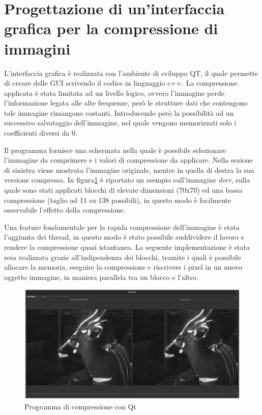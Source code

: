 \part{Progettazione di un'interfaccia grafica per la compressione di immagini}

L'interfaccia grafica è realizzata con l'ambiente di sviluppo QT\cite{qt}, il quale permette di creare delle GUI scrivendo il codice in linguaggio c++. La compressione applicata è stata limitata ad un livello logico, ovvero l'immagine perde l'informazione legata alle alte frequenze, però le strutture dati che contengono tale immagine rimangono costanti. Introducendo però la possibilità ad un successivo salvataggio dell'immagine, nel quale vengono memorizzati solo i coefficienti diversi da 0.

Il programma fornisce una schermata nella quale è possibile selezionare l'immagine da comprimere e i valori di compressione da applicare. Nella sezione di sinistra viene mostrata l'immagine originale, mentre in quella di destra la sua versione compressa. In figura\ref{fig:deer} è riportato un esempio sull'immagine \textit{deer}, sulla quale sono stati applicati blocchi di elevate dimensioni (70x70) ed una bassa compressione (taglio ad 11 su 138 possibili), in questo modo è facilmente osservabile l'effetto della compressione.

Una feature fondamentale per la rapida compressione dell'immagine è stata l'aggiunta dei thread, in questo modo è stato possibile suddividere il lavoro e rendere la compressione quasi istantanea. La seguente implementazione è stata resa realizzata grazie all'indipendenza dei blocchi, tramite i quali è possibile allocare la memoria, eseguire la compressione e riscrivere i pixel in un nuovo oggetto immagine, in maniera parallela tra un blocco e l'altro.

\begin{figure}[h]
	\centering
	\includegraphics[width=1\linewidth]{figures/qt_deer}
	\caption{Programma di compressione con Qt}
	\label{fig:deer}
\end{figure}


